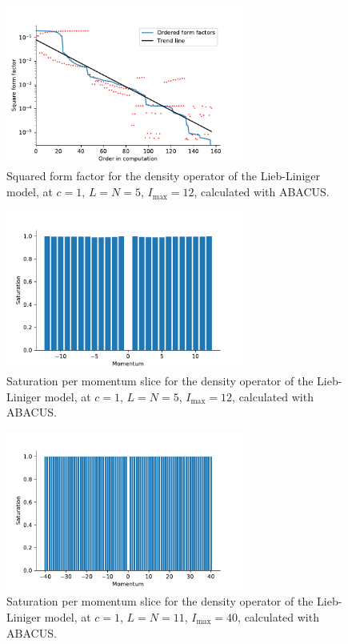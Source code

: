 \documentclass[11pt, a4paper]{report} %
\begin{document}
\begin{figure}[tb!]
  \centering
  \includegraphics[width=0.7\textwidth]{abacus_ff_sq_12_5.pdf}
  \caption{Squared form factor for the density operator of the Lieb-Liniger model, at \(c=1\), \(L=N=5\), \(I_{\max}=12\), calculated with ABACUS.}
  \label{fig:abacusformfactors_12_5}
\end{figure}

\begin{figure}[tb!]
  \centering
  \includegraphics[width=0.7\textwidth]{abacus_saturations_12_5.pdf}
  \caption{Saturation per momentum slice for the density operator of the Lieb-Liniger model, at \(c=1\), \(L=N=5\), \(I_{\max}=12\), calculated with ABACUS.}
  \label{fig:abacus_saturations_12_5}
\end{figure}

\begin{figure}[tb!]
  \centering
  \includegraphics[width=0.7\textwidth]{abacus_saturations.pdf}
  \caption{Saturation per momentum slice for the density operator of the Lieb-Liniger model, at \(c=1\), \(L=N=11\), \(I_{\max}=40\), calculated with ABACUS.}
  \label{fig:abacus_saturations}
\end{figure}
\end{document}
